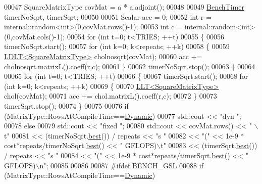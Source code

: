 \begin{DoxyCode}
00047   SquareMatrixType covMat =  a * a.adjoint();
00048 
00049   \hyperlink{class_eigen_1_1_bench_timer}{BenchTimer} timerNoSqrt, timerSqrt;
00050 
00051   Scalar acc = 0;
00052   \textcolor{keywordtype}{int} r = internal::random<int>(0,covMat.rows()-1);
00053   \textcolor{keywordtype}{int} c = internal::random<int>(0,covMat.cols()-1);
00054   \textcolor{keywordflow}{for} (\textcolor{keywordtype}{int} t=0; t<TRIES; ++t)
00055   \{
00056     timerNoSqrt.start();
00057     \textcolor{keywordflow}{for} (\textcolor{keywordtype}{int} k=0; k<repeats; ++k)
00058     \{
00059       \hyperlink{group___cholesky___module_class_eigen_1_1_l_d_l_t}{LDLT<SquareMatrixType>} cholnosqrt(covMat);
00060       acc += cholnosqrt.matrixL().coeff(r,c);
00061     \}
00062     timerNoSqrt.stop();
00063   \}
00064 
00065   \textcolor{keywordflow}{for} (\textcolor{keywordtype}{int} t=0; t<TRIES; ++t)
00066   \{
00067     timerSqrt.start();
00068     \textcolor{keywordflow}{for} (\textcolor{keywordtype}{int} k=0; k<repeats; ++k)
00069     \{
00070       \hyperlink{group___cholesky___module_class_eigen_1_1_l_l_t}{LLT<SquareMatrixType>} chol(covMat);
00071       acc += chol.matrixL().coeff(r,c);
00072     \}
00073     timerSqrt.stop();
00074   \}
00075 
00076   \textcolor{keywordflow}{if} (MatrixType::RowsAtCompileTime==\hyperlink{namespace_eigen_ad81fa7195215a0ce30017dfac309f0b2}{Dynamic})
00077     std::cout << \textcolor{stringliteral}{"dyn   "};
00078   \textcolor{keywordflow}{else}
00079     std::cout << \textcolor{stringliteral}{"fixed "};
00080   std::cout << covMat.rows() << \textcolor{stringliteral}{" \(\backslash\)t"}
00081             << (timerNoSqrt.\hyperlink{class_eigen_1_1_bench_timer_ae8b673b0fa356d3432c7a65c79e8af0e}{best}()) / repeats << \textcolor{stringliteral}{"s "}
00082             << \textcolor{stringliteral}{"("} << 1e-9 * cost*repeats/timerNoSqrt.\hyperlink{class_eigen_1_1_bench_timer_ae8b673b0fa356d3432c7a65c79e8af0e}{best}() << \textcolor{stringliteral}{" GFLOPS)\(\backslash\)t"}
00083             << (timerSqrt.\hyperlink{class_eigen_1_1_bench_timer_ae8b673b0fa356d3432c7a65c79e8af0e}{best}()) / repeats << \textcolor{stringliteral}{"s "}
00084             << \textcolor{stringliteral}{"("} << 1e-9 * cost*repeats/timerSqrt.\hyperlink{class_eigen_1_1_bench_timer_ae8b673b0fa356d3432c7a65c79e8af0e}{best}() << \textcolor{stringliteral}{" GFLOPS)\(\backslash\)n"};
00085 
00086 
00087 \textcolor{preprocessor}{  #ifdef BENCH\_GSL}
00088   \textcolor{keywordflow}{if} (MatrixType::RowsAtCompileTime==\hyperlink{namespace_eigen_ad81fa7195215a0ce30017dfac309f0b2}{Dynamic})

\end{DoxyCode}
